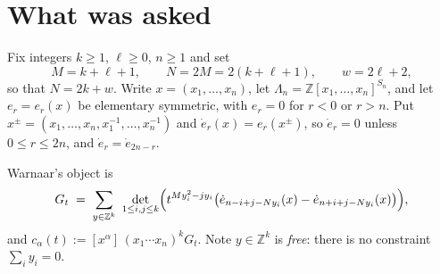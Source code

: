 \documentclass[11pt]{article}
\theoremstyle{plain}
\theoremstyle{definition}
\newcommand{\edot}{\dot{e}}
\newcommand{\Z}{\mathbb{Z}}
\newcommand{\Lam}{\Lambda_n}
\begin{document}
\section{What was asked}

Fix integers $k\ge1$, $\ell\ge0$, $n\ge1$ and set
\[
  M=k+\ell+1,\qquad N=2M=2(k+\ell+1),\qquad w=2\ell+2,
\]
so that $N=2k+w$.  Write $x=(x_1,\dots,x_n)$, let $\Lam=\Z[x_1,\dots,x_n]^{S_n}$, and let
$e_r=e_r(x)$ be elementary symmetric, with $e_r=0$ for $r<0$ or $r>n$.  Put
$x^{\pm}=(x_1,\dots,x_n,x_1^{-1},\dots,x_n^{-1})$ and $\edot_r(x)=e_r(x^{\pm})$, so
$\edot_r=0$ unless $0\le r\le 2n$, and $\edot_r=\edot_{2n-r}$.

Warnaar's object \cite[\texttt{Eq\_generalise}, source line 3874]{W} is
\begin{equation}\label{eq:G}
  G_t \;=\; \sum_{y\in\Z^k}\ \det_{1\le i,j\le k}
  \Bigl(t^{My_i^2-jy_i}\bigl(\edot_{n-i+j-Ny_i}(x)-\edot_{n+i+j-Ny_i}(x)\bigr)\Bigr),
\end{equation}
and $c_\alpha(t):=[x^\alpha]\,(x_1\cdots x_n)^kG_t$.  Note $y\in\Z^k$ is \emph{free}: there
is no constraint $\sum_iy_i=0$.
\end{document}
